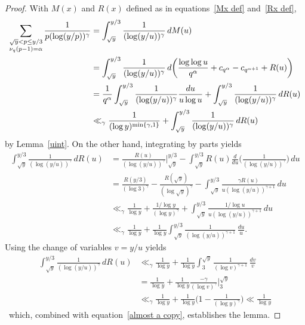 \documentclass[12pt,reqno]{amsart}
\theoremstyle{definition}
\begin{document}
\begin{proof}
With $M(x)$ and $R(x)$ defined as in equations~\eqref{Mx def} and~\eqref{Rx def},
\begin{align}
\sum_{\substack{\sqrt y<p\le y/3\\ \nu_q(p-1)=\alpha}} \frac1{p(\log(y/p))^\gamma} &= \int_{\sqrt y}^{y/3} \frac1{(\log(y/u))^\gamma} \,dM(u) \notag \\
&=\int_{\sqrt y}^{y/3} \frac1{(\log(y/u))^\gamma} \,d\bigg( \frac{\log\log u}{q^\alpha} + c_{q^\alpha} - c_{q^{\alpha+1}} + R(u) \bigg) \notag \\
&=\frac 1{q^\alpha} \int_{\sqrt y}^{y/3} \frac1{(\log(y/u))^\gamma} \frac {du}{u\log u} + \int_{\sqrt y}^{y/3} \frac1{(\log(y/u))^\gamma} \,dR(u) \notag \\
&\ll_\gamma \frac 1{(\log y)^{\min\{\gamma,1\}}} + \int_{\sqrt y}^{y/3} \frac1{(\log(y/u))^\gamma} \,dR(u) \label{almost a copy}
\end{align}
by Lemma~\ref{uint}.
On the other hand, integrating by parts yields
\begin{align*}
\int_{\sqrt y}^{y/3} \frac1{(\log(y/u))^\gamma} \,dR(u) &= \frac{R(u)}{(\log(y/u))^\gamma} \bigg|_{\sqrt y}^{y/3} - \int_{\sqrt y}^{y/3} R(u) \frac d{du} \bigg( \frac1{(\log(y/u))^\gamma} \bigg) \,du \\
&= \frac{R(y/3)}{(\log3)^\gamma} - \frac{R(\sqrt y)}{(\log\sqrt y)^\gamma} - \int_{\sqrt y}^{y/3} \frac{\gamma R(u)}{u(\log(y/u))^{\gamma+1}} \,du \\
&\ll_\gamma \frac1{\log y} + \frac{1/\log y}{(\log y)^\gamma} + \int_{\sqrt y}^{y/3} \frac{1/\log u}{u(\log(y/u))^{\gamma+1}} \,du \\
&\ll_\gamma \frac1{\log y} + \frac1{\log y} \int_{\sqrt y}^{y/3} \frac1{(\log(y/u))^{\gamma+1}} \,\frac{du}u.
\end{align*}
Using the change of variables $v=y/u$ yields
\begin{align*}
\int_{\sqrt y}^{y/3} \frac1{(\log(y/u))^\gamma} \,dR(u) &\ll_\gamma \frac1{\log y} + \frac1{\log y} \int_3^{\sqrt y} \frac1{(\log v)^{\gamma+1}} \,\frac{dv}v \\
&= \frac1{\log y} + \frac1{\log y} \frac{-\gamma}{(\log v)^\gamma} \bigg|_3^{\sqrt y} \\
&\ll_\gamma \frac1{\log y} + \frac1{\log y} \bigg( 1 - \frac1{(\log y)^\gamma} \bigg) \ll \frac1{\log y}
\end{align*}\
which, combined with equation~\eqref{almost a copy}, establishes the lemma.
\end{proof}
\end{document}
